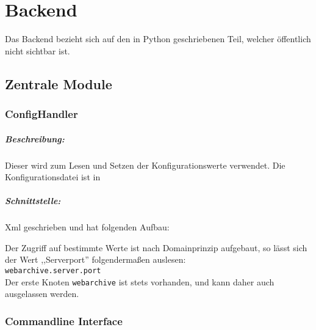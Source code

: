 \chapter{Backend}
\label{cha:backend}
Das Backend bezieht sich auf den in Python geschriebenen Teil, welcher öffentlich nicht sichtbar ist.

\section{Zentrale Module} 
\label{sec:zentrale_module}

\subsection{ConfigHandler}
\label{sub:confighandler}

\paragraph{Beschreibung:}
\label{par:beschreibung_}
Dieser wird zum Lesen und Setzen der Konfigurationswerte verwendet. Die Konfigurationsdatei ist in 
\paragraph{Schnittstelle:}
\label{par:schnittstelle_}
Xml geschrieben und hat folgenden Aufbau:
    
Der Zugriff auf bestimmte Werte ist nach Domainprinzip aufgebaut, so lässt sich der Wert ,,Serverport'' folgendermaßen auslesen: \\
\texttt{webarchive.server.port} \\
Der erste Knoten \texttt{webarchive} ist stets vorhanden, und kann daher auch ausgelassen werden.


\subsection{Commandline Interface}
\label{sub:commandline_interface}
